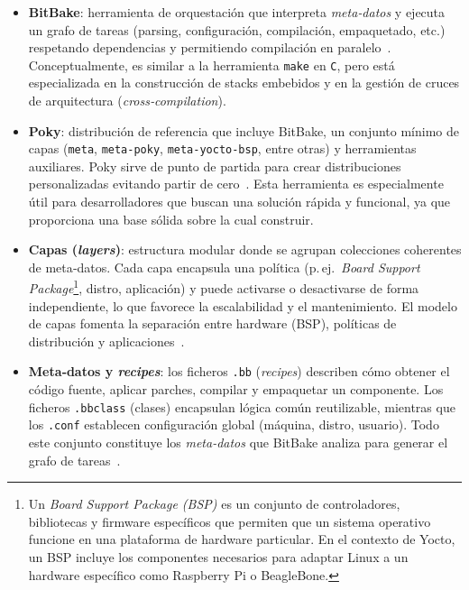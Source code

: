 \begin{itemize}
    \item \textbf{BitBake}: herramienta de orquestación que interpreta \emph{meta‐datos} y ejecuta un grafo de tareas (parsing, configuración, compilación, empaquetado, etc.) respetando dependencias y permitiendo compilación en paralelo \cite{bitbake_manual_2025}.  Conceptualmente, es similar a la herramienta \texttt{make} en \texttt{C}, pero está especializada en la construcción de stacks embebidos y en la gestión de cruces de arquitectura (\emph{cross‑compilation}).
      
    \item \textbf{Poky}: distribución de referencia que incluye BitBake, un conjunto mínimo de capas (\texttt{meta}, \texttt{meta‐poky}, \texttt{meta‐yocto‐bsp}, entre otras) y herramientas auxiliares.  Poky sirve de punto de partida para crear distribuciones personalizadas evitando partir de cero \cite{yocto_overview_2025}. Esta herramienta es especialmente útil para desarrolladores que buscan una solución rápida y funcional, ya que proporciona una base sólida sobre la cual construir.
    
    \item \textbf{Capas (\emph{layers})}: estructura modular donde se agrupan colecciones coherentes de meta‑datos.  Cada capa encapsula una política (p.\,ej.\ \textit{Board Support Package}\footnote{Un \textit{Board Support Package (BSP)} es un conjunto de controladores, bibliotecas y firmware específicos que permiten que un sistema operativo funcione en una plataforma de hardware particular. En el contexto de Yocto, un BSP incluye los componentes necesarios para adaptar Linux a un hardware específico como Raspberry Pi o BeagleBone.}, distro, aplicación) y puede activarse o desactivarse de forma independiente, lo que favorece la escalabilidad y el mantenimiento.  El modelo de capas fomenta la separación entre hardware (BSP), políticas de distribución y aplicaciones \cite{yocto_overview_2025}.
    
    \item \textbf{Meta‑datos y \emph{recipes}}: los ficheros \verb|.bb| (\emph{recipes}) describen cómo obtener el código fuente, aplicar parches, compilar y empaquetar un componente.  Los ficheros \verb|.bbclass| (clases) encapsulan lógica común reutilizable, mientras que los \verb|.conf| establecen configuración global (máquina, distro, usuario).  Todo este conjunto constituye los \textit{meta-datos} que BitBake analiza para generar el grafo de tareas \cite{bitbake_manual_2025}.
    

\end{itemize}
